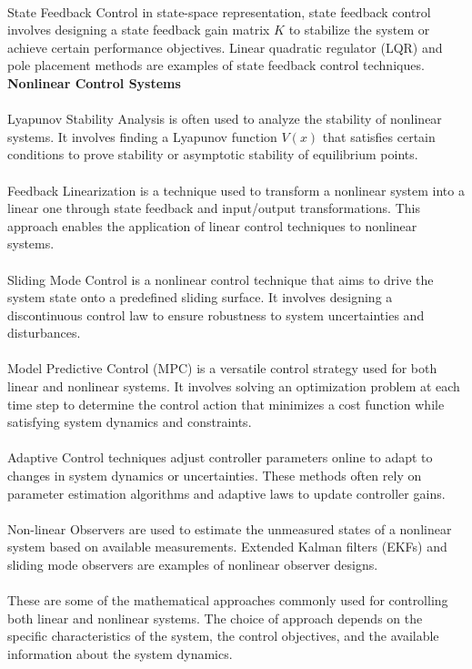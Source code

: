 \documentclass[12pt]{report}
\begin{document}
\\
State Feedback Control in state-space representation, state feedback control involves designing a state feedback gain matrix \( K \) to stabilize the system or achieve certain performance objectives. Linear quadratic regulator (LQR) and pole placement methods are examples of state feedback control techniques.\\
\newpage
\noindent \textbf{Nonlinear Control Systems}\\
\\
Lyapunov Stability Analysis  is often used to analyze the stability of nonlinear systems. It involves finding a Lyapunov function \( V(x) \) that satisfies certain conditions to prove stability or asymptotic stability of equilibrium points.\\
\\
Feedback Linearization is a technique used to transform a nonlinear system into a linear one through state feedback and input/output transformations. This approach enables the application of linear control techniques to nonlinear systems.\\
\\
Sliding Mode Control is a nonlinear control technique that aims to drive the system state onto a predefined sliding surface. It involves designing a discontinuous control law to ensure robustness to system uncertainties and disturbances.\\
\\
Model Predictive Control (MPC) is a versatile control strategy used for both linear and nonlinear systems. It involves solving an optimization problem at each time step to determine the control action that minimizes a cost function while satisfying system dynamics and constraints.\\
\\
Adaptive Control techniques adjust controller parameters online to adapt to changes in system dynamics or uncertainties. These methods often rely on parameter estimation algorithms and adaptive laws to update controller gains.\\
\\
Non-linear Observers are used to estimate the unmeasured states of a nonlinear system based on available measurements. Extended Kalman filters (EKFs) and sliding mode observers are examples of nonlinear observer designs.\\
\\
\noindent These are some of the mathematical approaches commonly used for controlling both linear
and nonlinear systems. The choice of approach depends on the specific characteristics of the
system, the control objectives, and the available information about the system dynamics.\\
\end{document}
